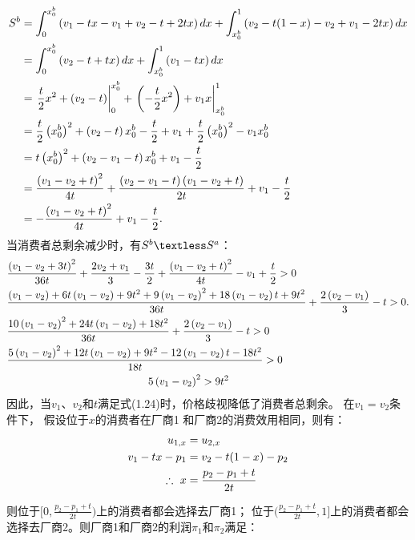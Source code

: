 \begin{align}
 S^b&=\int_0^{x_0^b}\left(v_1-t x-v_1+v_2-t+2 t x\right) d x+\int_{x_0^b}^1\left(v_2-t(1-x)-v_2+v_1-2 t x\right) d x \notag \\
&=\int_0^{x_0^b}\left(v_2-t+t x\right) d x+\int_{x_0^b}^1\left(v_1-t x\right) d x \notag\\
&= \left.\frac{t}{2} x^2+\left(v_2-t\right)  \right|_0^{x_0^b}+\left.\left(-\frac{t}{2} x^2\right)+v_1 x\right|_{x_0^b} ^1 \notag\\
&= \frac{t}{2}\left(x_0^b\right)^2+\left(v_2-t\right) x_0^b-\frac{t}{2}+v_1+\frac{t}{2}\left(x_0^b\right)^2-v_1 x_0^b \notag\\
&=t\left(x_0^b\right)^2+\left(v_2-v_1-t\right) x_0^b+v_1-\frac{t}{2} \notag\\
&=\frac{\left(v_1-v_2+t\right)^2}{4 t}+\frac{\left(v_2-v_1-t\right)\left(v_1-v_2+t\right)}{2 t}+v_1-\frac{t}{2} \notag \\
&=-\frac{\left(v_1-v_2+t\right)^2}{4 t}+v_1-\frac{t}{2} .
\end{align}
当消费者总剩余减少时，有$S^b\textless S^a$：
\begin{align}
&\frac{\left(v_1-v_2+3 t\right)^2}{36 t}+\frac{2 v_2+v_1}{3}-\frac{3 t}{2}+\frac{\left(v_1-v_2+t\right)^2}{4 t}-v_1+\frac{t}{2}>0 \notag\\
&\frac{\left(v_1-v_2\right)+6 t\left(v_1-v_2\right)+9 t^2+9\left(v_1-v_2\right)^2+18\left(v_1-v_2\right) t+9 t^2}{36 t}+\frac{2\left(v_2-v_1\right)}{3}-t>0 . \notag \\
&\frac{10\left(v_1-v_2\right)^2+24 t\left(v_1-v_2\right)+18 t^2}{36 t}+\frac{2\left(v_2-v_1\right)}{3}-t>0 \notag \\
&\frac{5\left(v_1-v_2\right)^2+12 t\left(v_1-v_2\right)+9 t^2-12\left(v_1-v_2\right) t-18 t^2}{18 t}>0 \notag \\
& \qquad \ \qquad \ \qquad  \qquad  \qquad \ \qquad \ 5\left(v_1-v_2\right)^2>9 t^2
\end{align}
因此，当$v_1$、$v_2$和$t$满足式(1.24)时，价格歧视降低了消费者总剩余。
\qpart
\qsubpart 
在$v_1=v_2$条件下，
假设位于$x$的消费者在厂商1 和厂商2的消费效用相同，则有：
\begin{align}
     u_{1,x}&=u_{2,x} \notag \\ 
     v_1-tx-p_1 &= v_2-t(1-x)-p_2 \notag \\
     \therefore \  x &= \frac{p_2-p_1+t}{2t}
\end{align}

则位于$[0,\frac{p_2-p_1+t}{2t})$上的消费者都会选择去厂商1； 位于$(\frac{p_2-p_1+t}{2t},1]$上的消费者都会选择去厂商2。则厂商1和厂商2的利润$\pi_1$和$\pi_2$满足：

